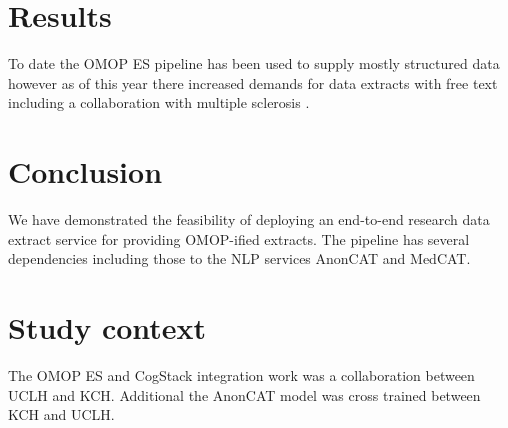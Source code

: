 \documentclass[11pt]{article}
\begin{document}
\section{Results}
To date the OMOP ES pipeline has been used to supply mostly structured data however as of this year there increased demands for data extracts with free text including a collaboration with multiple sclerosis \cite{pinpoint}. 

\section{Conclusion}
We have demonstrated the feasibility of deploying an end-to-end research data extract service for providing OMOP-ified extracts. The pipeline has several dependencies including those to the NLP services AnonCAT and MedCAT.

\section{Study context}
The OMOP ES and CogStack integration work was a collaboration between UCLH and KCH. Additional the AnonCAT model was cross trained between KCH and UCLH.



\end{document}
